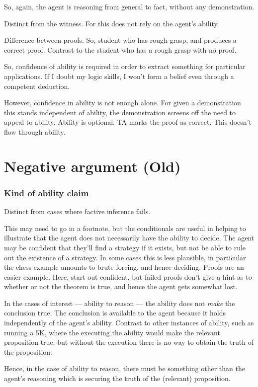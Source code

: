 \documentclass[10pt]{article}
\begin{document}
So, again, the agent is reasoning from general to fact, without any demonstration.


Distinct from the witness.
For this does not rely on the agent's ability.

Difference between proofs.
So, student who has rough grasp, and produces a correct proof.
Contrast to the student who has a rough grasp with no proof.

So, confidence of ability is required in order to extract something for particular applications.
If I doubt my logic skills, I won't form a belief even through a competent deduction.

However, confidence in ability is not enough alone.
For given a demonstration this stands independent of ability, the demonstration screens off the need to appeal to ability.
Ability is optional.
TA marks the proof as correct.
This doesn't flow through ability.




\newpage

\section{Negative argument (Old)}
\label{sec:negative-argument}

\subsubsection{Kind of ability claim}
\label{sec:kind-ability-claim}

Distinct from cases where factive inference fails.

\begin{note}
  This may need to go in a footnote, but the conditionals are useful in helping to illustrate that the agent does not necessarily have the ability to decide.
  The agent may be confident that they'll find a strategy if it exists, but not be able to rule out the existence of a strategy.
  In some cases this is less plausible, in particular the chess example amounts to brute forcing, and hence deciding.
  Proofs are an easier example.
  Here, start out confident, but failed proofs don't give a hint as to whether or not the theorem is true, and hence the agent gets somewhat lost.
\end{note}

\begin{note}
  In the cases of interest --- ability to reason --- the ability does not \emph{make} the conclusion true.
  The conclusion is available to the agent because it holds independently of the agent's ability.
  Contrast to other instances of ability, such as running a 5K, where the executing the ability would make the relevant proposition true, but without the execution there is no way to obtain the truth of the proposition.

  Hence, in the case of ability to reason, there must be something other than the agent's reasoning which is securing the truth of the (relevant) proposition.
\end{note}
\end{document}
